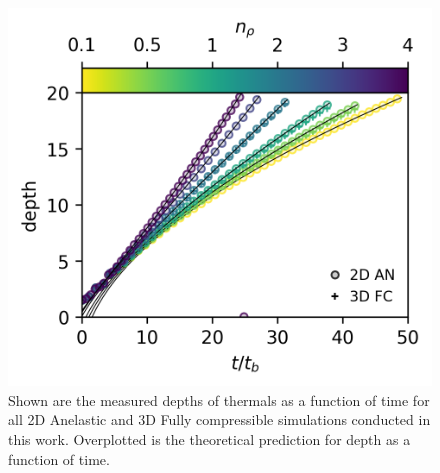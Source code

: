 \documentclass[twocolumn, amsmath, amsfonts, amssymb, trackchanges]{aastex62}
\begin{document}
\begin{figure}[t!]
    \includegraphics[width=\columnwidth]{results_panels_d_v_t.png}
    \caption{Shown are the measured depths of thermals as a function of time for all 2D
	Anelastic and 3D Fully compressible simulations conducted in this work. Overplotted
	is the theoretical prediction for depth as a function of time.
    \label{fig:results_d_v_t} }
\end{figure}
\end{document}
